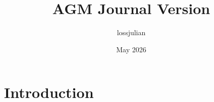 \documentclass{article}
\title{AGM Journal Version}
\author{lossjulian }
\date{May 2026}
\begin{document}
\maketitle

\section{Introduction}
\end{document}
